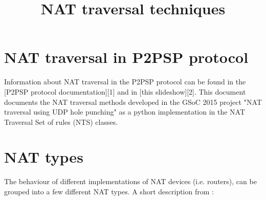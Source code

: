 \documentclass{article}
\title{NAT traversal techniques}
\begin{document}
\maketitle

\section{NAT traversal in P2PSP protocol}

Information about NAT traversal in the P2PSP protocol can be found in
the [P2PSP protocol documentation][1] and in [this slideshow][2].
This document documents the NAT traversal methods developed in the
GSoC 2015 project "NAT traversal using UDP hole punching" as a python
implementation in the NAT Traversal Set of rules (NTS) classes.

\section{NAT types}

The behaviour of different implementations of NAT devices
(i.e. routers), can be grouped into a few different NAT types. A short
description from \citep{3b}:
\end{document}
